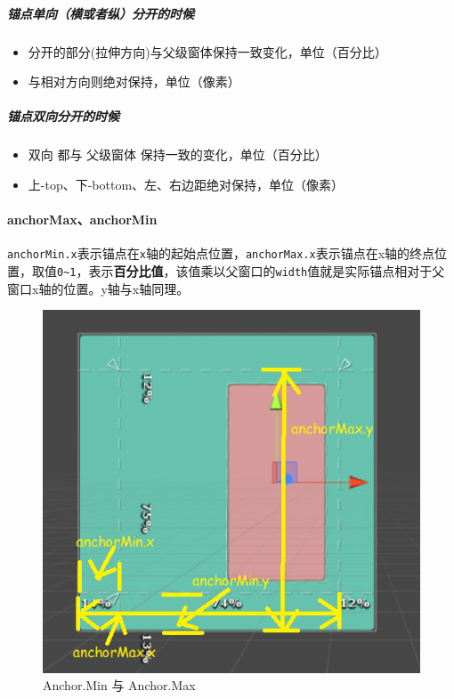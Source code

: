 \documentclass[UTF8,a4paper,12pt]{ctexbook}
\begin{document}
				\subparagraph{锚点单向（横或者纵）分开的时候}
					\begin{itemize}[itemindent = 2em]
						\item 分开的部分(拉伸方向)与父级窗体保持一致变化，单位（百分比）
						\item 与相对方向则绝对保持，单位（像素）
					\end{itemize}
				
				\subparagraph{锚点双向分开的时候}
					\begin{itemize}[itemindent = 2em]
						\item 双向 都与 父级窗体 保持一致的变化，单位（百分比）
						\item 上-top、下-bottom、左、右边距绝对保持，单位（像素）
					\end{itemize}
		
			\paragraph{anchorMax、anchorMin}
				\verb|anchorMin.x|表示锚点在\verb|x|轴的起始点位置，\verb|anchorMax.x|表示锚点在x轴的终点位置，取值\verb|0~1|，表示\textbf{百分比值}，该值乘以父窗口的\verb|width|值就是实际锚点相对于父窗口x轴的位置。y轴与x轴同理。
		
					\begin{figure}[H]
						\centering
						\includegraphics[scale=0.8]{Anchors-3.png}
						\caption{Anchor.Min 与 Anchor.Max}
					\end{figure}
		
\end{document}
